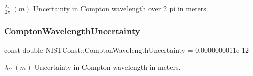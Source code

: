 $\frac{\lambda_C}{2\pi} \ (m)$ Uncertainty in Compton wavelength over 2 pi in meters. \mbox{\label{group___compton_wavelength_ga4845f956ea0bf6f4eaf7396173b09430}} 
\subsubsection{\texorpdfstring{Compton\+Wavelength\+Uncertainty}{ComptonWavelengthUncertainty}}
{\footnotesize\ttfamily const double N\+I\+S\+T\+Const\+::\+Compton\+Wavelength\+Uncertainty = 0.\+0000000011e-\/12}

$\lambda_C \ (m)$ Uncertainty in Compton wavelength in meters. 
